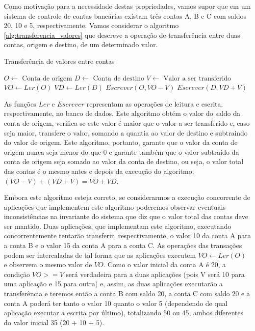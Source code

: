 \documentclass[11pt,twoside,a4paper]{book}
\begin{document}

Como motivação para a necessidade destas propriedades, vamos supor que em um sistema de controle de contas bancárias existam três contas A, B e C com saldos 20, 10 e 5, respectivamente. Vamos considerar o algoritmo \ref{alg:transferencia_valores} que descreve a operação de transferência entre duas contas, origem e destino, de um determinado valor.

\begin{algorithm}
\caption{Transferência de valores entre contas}
\label{alg:transferencia_valores}
\begin{algorithmic}[1]
\State $O \gets \text{ Conta de origem}$
\State $D \gets \text{ Conta de destino}$
\State $V \gets \text{ Valor a ser transferido}$
\State $VO \gets Ler(O)$
	\State $VD \gets Ler(D)$
	\State $Escrever(O, VO - V)$
	\State $Escrever(D, VD + V)$
\EndIf
\end{algorithmic}
\end{algorithm}

As funções $Ler$ e $Escrever$ representam as operações de leitura e escrita, respectivamente, no banco de dados. Este algoritmo obtém o valor do saldo da conta de origem, verifica se este valor é maior que o valor a ser transferido e, caso seja maior, transfere o valor, somando a quantia ao valor de destino e subtraindo do valor de origem. Este algoritmo, portanto, garante que o valor da conta de origem nunca seja menor do que 0 e garante também que o valor subtraído da conta de origem seja somado ao valor da conta de destino, ou seja, o valor total das contas é o mesmo antes e depois da execução do algoritmo: $(VO - V) + (VD + V) = VO + VD$.

Embora este algoritmo esteja correto, se considerarmos a execução concorrente de aplicações que implementem este algoritmo poderemos observar eventuais inconsistências na invariante do sistema que diz que o valor total das contas deve ser mantido. Duas aplicações, que implementam este algoritmo, executando concorrentemente tentarão transferir, respectivamente, o valor 10 da conta A para a conta B e o valor 15 da conta A para a conta C. As operações das transações podem ser intercaladas de tal forma que as aplicações executem $VO \gets Ler(O)$ e observem o mesmo valor de $VO$. Como o valor inicial da conta A é 20, a condição $VO >= V$ será verdadeira para a duas aplicações (pois V será 10 para uma aplicação e 15 para outra) e, assim, as duas aplicações executarão a transferência e teremos então a conta B com saldo 20, a conta C com saldo 20 e a conta A poderá ter tanto o valor 10 quanto o valor 5 (dependendo de qual aplicação executar a escrita por último), totalizando 50 ou 45, ambos diferentes do valor inicial 35 (20 + 10 + 5).
\end{document}
